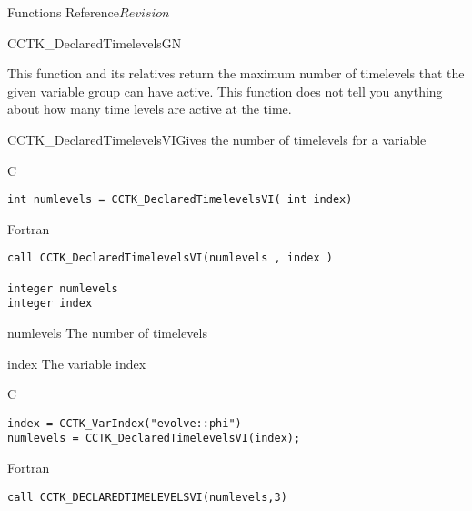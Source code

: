 \begin{cactuspart}{ Functions Reference}{}{$Revision$}
\begin{FunctionDescription}{CCTK\_DeclaredTimelevelsGN}
\begin{Discussion}
This function and its relatives return the maximum number of timelevels that the given variable group can have active.  This function does not tell you anything about how many time levels are active at the time.
\end{Discussion}
\end{FunctionDescription}



\begin{FunctionDescription}{CCTK\_DeclaredTimelevelsVI}{Gives the number of timelevels for a variable}
\label{CCTK-DeclaredTimelevelsVI}
\begin{SynopsisSection}
\begin{Synopsis}{C}
\begin{verbatim}int numlevels = CCTK_DeclaredTimelevelsVI( int index)\end{verbatim}
\end{Synopsis}
\begin{Synopsis}{Fortran}
\begin{verbatim}call CCTK_DeclaredTimelevelsVI(numlevels , index )

integer numlevels
integer index\end{verbatim}
\end{Synopsis}
\end{SynopsisSection}
\begin{ParameterSection}
\begin{Parameter}{numlevels}
The number of timelevels
\end{Parameter}
\begin{Parameter}{index}
The variable index
\end{Parameter}
\end{ParameterSection}

\begin{ExampleSection}
\begin{Example}{C}
\begin{verbatim}
index = CCTK_VarIndex("evolve::phi")
numlevels = CCTK_DeclaredTimelevelsVI(index);
\end{verbatim}
\end{Example}
\begin{Example}{Fortran}
\begin{verbatim}
call CCTK_DECLAREDTIMELEVELSVI(numlevels,3)
\end{verbatim}
\end{Example}
\end{ExampleSection}
\end{FunctionDescription}


\end{cactuspart}
